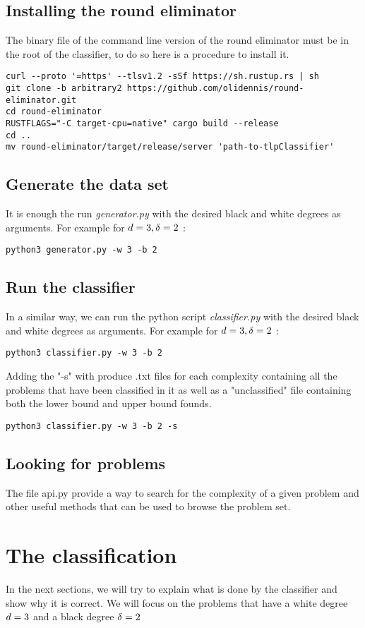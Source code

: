 \subsection{Installing the round eliminator}
The binary file of the command line version of the round eliminator must be in the root of the classifier, to do so here is a procedure to install it.
\begin{lstlisting}
curl --proto '=https' --tlsv1.2 -sSf https://sh.rustup.rs | sh
git clone -b arbitrary2 https://github.com/olidennis/round-eliminator.git
cd round-eliminator
RUSTFLAGS="-C target-cpu=native" cargo build --release
cd ..
mv round-eliminator/target/release/server 'path-to-tlpClassifier'
\end{lstlisting}
\subsection{Generate the data set}
It is enough the run \textit{generator.py} with the desired black and white degrees as arguments. For example for $d = 3, \delta =2$ :
\begin{lstlisting}
python3 generator.py -w 3 -b 2 
\end{lstlisting}
\subsection{Run the classifier}
In a similar way, we can run the python script \textit{classifier.py} with the desired black and white degrees as arguments. For example for $d = 3, \delta =2$ :
\begin{lstlisting}
python3 classifier.py -w 3 -b 2 
\end{lstlisting}
Adding the "-s" with produce .txt files for each complexity containing all the problems that have been classified in it as well as a "unclassified" file containing both the lower bound and upper bound founds.
\begin{lstlisting}
python3 classifier.py -w 3 -b 2 -s
\end{lstlisting}
\subsection{Looking for problems}
The file api.py provide a way to search for the complexity of a given problem and other useful methods that can be used to browse the problem set.
\section{The classification}
In the next sections, we will try to explain what is done by the classifier and show why it is correct. We will focus on the problems that have a white degree $d = 3$ and a black degree $\delta = 2$